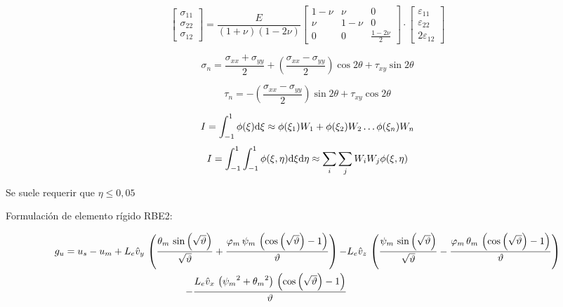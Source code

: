 \begin{equation}
\begin{bmatrix}
\sigma_{11} \\
\sigma_{22} \\
\sigma_{12}
\end{bmatrix}
={\frac{E}{(1+\nu)(1-2\nu)}} 
\begin{bmatrix}
1-\nu & \nu &0 \\
\nu &1-\nu& 0 \\
0 & 0 & \frac{1-2\nu}{2}
\end{bmatrix}
\cdot
\begin{bmatrix}
\varepsilon_{11} \\
\varepsilon_{22} \\
2\varepsilon_{12}
\end{bmatrix}
\end{equation}

\begin{equation}
\sigma_{n}=\frac{\sigma_{xx}+\sigma_{yy}}{2}+\left(\frac{\sigma_{xx}-\sigma_{yy}}{2}\right)\cos 2\theta +\tau_{xy}\sin 2\theta 
\end{equation}

\begin{equation}
\tau_{n}=-\left(\frac{\sigma_{xx}-\sigma_{yy}}{2}\right)\sin 2\theta +\tau_{xy}\cos 2\theta 
\end{equation}

\begin{equation}
I=\int^1_{-1} \phi(\xi) \textrm{d} \xi \approx \phi(\xi_1) W_1+\phi(\xi_2) W_2 \ldots \phi(\xi_n) W_n
\end{equation}
\begin{equation}
I=\int^1_{-1} \int^1_{-1}\phi(\xi,\eta) \textrm{d} \xi \textrm{d} \eta\approx \sum_i \sum_j W_i W_j\phi(\xi,\eta) 
\end{equation}

Se suele requerir que $\eta\leq 0,05$


Formulación de elemento rígido RBE2:

\begin{align*}
g_u = u_{s}-u_{m}+L_{e}\hat{v}_{y}\,\left(\frac{\theta_{m}\,\sin\left(\sqrt{\vartheta}\right)}{\sqrt{\vartheta}}+\frac{\varphi_{m}\,\psi_{m}\,\left(\cos\left(\sqrt{\vartheta}\right)-1\right)}{\vartheta}\right)-&L_{e}\hat{v}_{z}\,\left(\frac{\psi_{m}\,\sin\left(\sqrt{\vartheta}\right)}{\sqrt{\vartheta}}-\frac{\varphi_{m}\,\theta_{m}\,\left(\cos\left(\sqrt{\vartheta}\right)-1\right)}{\vartheta}\right)\\
- \frac{L_{e}\hat{v}_{x}\,\left({\psi_{m}}^2+{\theta_{m}}^2\right)\,\left(\cos\left(\sqrt{\vartheta}\right)-1\right)}{\vartheta}
\end{align*}

